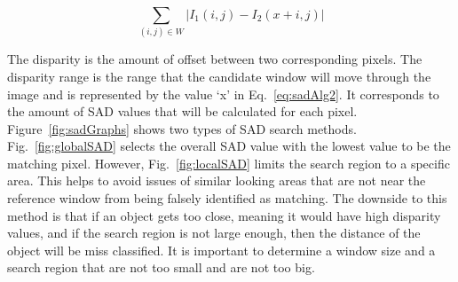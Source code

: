 \begin{equation}
	\sum\limits_{(i,j)\in W}\left| I_{1}(i,j)-I_{2}(x+i,j) \right|
	\label{eq:sadAlg2}
\end{equation}

The disparity is the amount of offset between two corresponding pixels. The disparity range is the range that the candidate window will move through the image and is represented by the value `x' in Eq.~\ref{eq:sadAlg2}. It corresponds to the amount of SAD values that will be calculated for each pixel. Figure~\ref{fig:sadGraphs} shows two types of SAD search methods. Fig.~\ref{fig:globalSAD} selects the overall SAD value with the lowest value to be the matching pixel. However, Fig.~\ref{fig:localSAD} limits the search region to a specific area. This helps to avoid issues of similar looking areas that are not near the reference window from being falsely identified as matching. The downside to this method is that if an object gets too close, meaning it would have high disparity values, and if the search region is not large enough, then the distance of the object will be miss classified. It is important to determine a window size and a search region that are not too small and are not too big.

